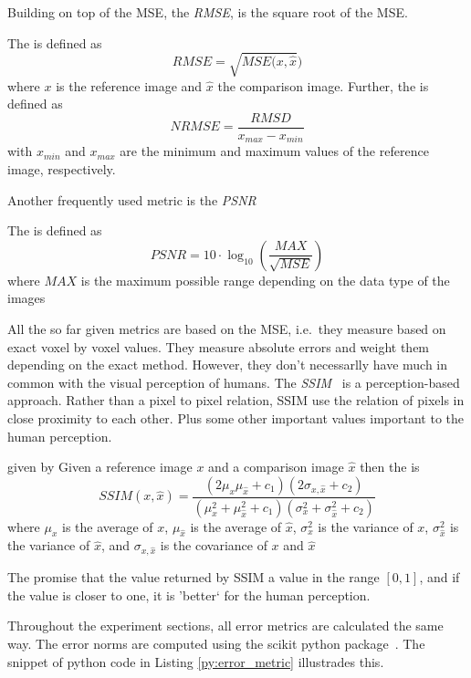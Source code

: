 Building on top of the \gls{MSE}, the \textit{\gls{RMSE}}, is the square root of the
\gls{MSE}.
\begin{definition}
	The \textit{} is defined as
	\[ RMSE = \sqrt{MSE(x, \hat{x}}) \]
	where \(x\) is the reference image and \(\hat{x}\) the comparison image. Further, the
	\textit{} is defined as
	\[ NRMSE = \frac{RMSD}{x_{max} - x_{min}} \]
	with \(x_{min}\) and \(x_{max}\) are the minimum and maximum values of the reference image,
	respectively.
\end{definition}
Another frequently used metric is the \textit{\gls{PSNR}}
\begin{definition}
	The \textit{} is defined as
	\[ PSNR = 10 \cdot \log_{10}\left( \frac{MAX}{\sqrt{MSE}} \right) \]
	where \(MAX\) is the maximum possible range depending on the data type of the images
\end{definition}
All the so far given metrics are based on the \gls{MSE}, i.e.\ they measure based on exact voxel by
voxel values. They measure absolute errors and weight them depending on the exact method. However,
they don't necessarlly have much in common with the visual perception of humans. The
\textit{\gls{SSIM}}~\cite{wang_image_2004,avanaki_exact_2009} is a perception-based approach.
Rather than a pixel to pixel relation, \gls{SSIM} use the relation of pixels in close proximity to
each other. Plus some other important values important to the human perception.
\begin{definition}
	given by Given a reference image \(x\) and a comparison image \(\hat{x}\) then the
	\textit{} is
	\[ SSIM(x, \hat{x}) = \frac{\left(2 \mu_x \mu_{\hat{x}} + c_1\right) \left( 2
			\sigma_{x, \hat{x}} + c_2 \right)}{\left(\mu_x^2
			+ \mu_{\hat{x}}^2 + c_1 \right) \left( \sigma_x^2 + \sigma_{\hat{x}}^2 + c_2 \right)} \]
	where \(\mu_x\) is the average of \(x\), \(\mu_{\hat{x}}\) is the average of \(\hat{x}\),
	\(\sigma_x^2\) is the variance of \(x\), \(\sigma_{\hat{x}}^2\) is the variance of
	\(\hat{x}\), and \(\sigma_{x, \hat{x}}\) is the covariance of \(x\) and \(\hat{x}\)
\end{definition}
The promise that the value returned by \gls{SSIM} a value in the range \([0, 1]\), and if the value
is closer to one, it is 'better` for the human perception.

Throughout the experiment sections, all error metrics are calculated the same way. The error norms
are computed using the scikit python package~\cite{van_der_walt_scikit-image_2014}. The snippet of
python code in Listing \autoref{py:error_metric} illustrades this.

